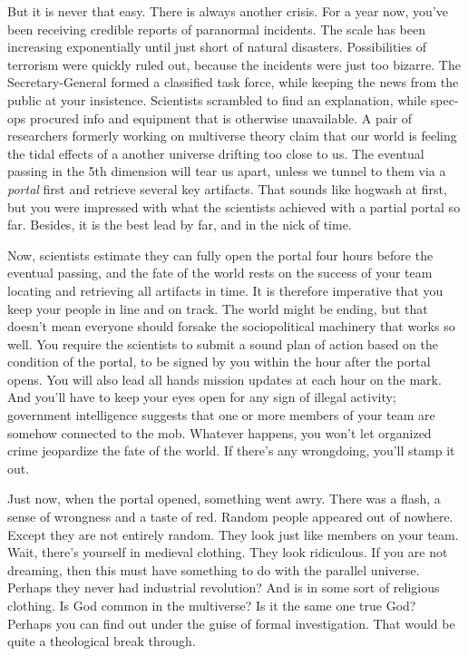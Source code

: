 \documentclass[char]{guildcamp3}
\begin{document}
But it is never that easy. There is always another crisis. For a year now, you've been receiving credible reports of paranormal incidents. The scale has been increasing exponentially until just short of natural disasters. Possibilities of terrorism were quickly ruled out, because the incidents were just too bizarre. The Secretary-General formed a classified task force, while keeping the news from the public at your insistence. Scientists scrambled to find an explanation, while spec-ops procured info and equipment that is otherwise unavailable. A pair of researchers formerly working on multiverse theory claim that our world is feeling the tidal effects of a another universe drifting too close to us. The eventual passing in the 5th dimension will tear us apart, unless we tunnel to them via a \emph{portal} first and retrieve several key artifacts. That sounds like hogwash at first, but you were impressed with what the scientists achieved with a partial portal so far. Besides, it is the best lead by far, and in the nick of time. 

Now, scientists estimate they can fully open the portal four hours before the eventual passing, and the fate of the world rests on the success of your team locating and retrieving all artifacts in time. It is therefore imperative that you keep your people in line and on track. The world might be ending, but that doesn't mean everyone should forsake the sociopolitical machinery that works so well. You require the scientists to submit a sound plan of action based on the condition of the portal, to be signed by you within the hour after the portal opens. You will also lead all hands mission updates at each hour on the mark. And you'll have to keep your eyes open for any sign of illegal activity; government intelligence suggests that one or more members of your team are somehow connected to the mob. Whatever happens, you won't let organized crime jeopardize the fate of the world. If there's any wrongdoing, you'll stamp it out.

Just now, when the portal opened, something went awry. There was a flash, a sense of wrongness and a taste of red. Random people appeared out of nowhere. Except they are not entirely random. They look just like members on your team. Wait, there's yourself in medieval clothing. They look ridiculous. If you are not dreaming, then this must have something to do with the parallel universe. Perhaps they never had industrial revolution? And \cTech{} is in some sort of religious clothing. Is God common in the multiverse? Is it the same one true God? Perhaps you can find out under the guise of formal investigation. That would be quite a theological break through.
\end{document}
